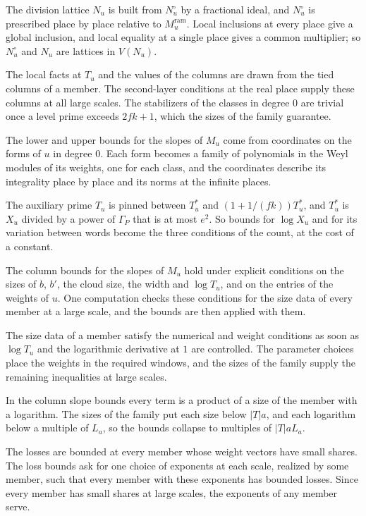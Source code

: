 The division lattice $N_u$ is built from $N^\circ_u$ by a fractional ideal,
and $N^\circ_u$ is prescribed place by place relative to $M^{\mathrm{ram}}_u$.
Local inclusions at every place give a global inclusion, and local equality at
a single place gives a common multiplier; so $N^\circ_u$ and $N_u$ are lattices
in $V(N_u)$.

The local facts at $T_u$ and the values of the columns are drawn from the tied
columns of a member. The second-layer conditions at the real place supply these
columns at all large scales. The stabilizers of the classes in degree $0$ are
trivial once a level prime exceeds $2fk+1$, which the sizes of the family
guarantee.

The lower and upper bounds for the slopes of $M_u$ come from coordinates on the
forms of $u$ in degree $0$. Each form becomes a family of polynomials in the
Weyl modules of its weights, one for each class, and the coordinates describe
its integrality place by place and its norms at the infinite places.

The auxiliary prime $T_u$ is pinned between $T^*_u$ and $(1+1/(fk))T^*_u$, and
$T^*_u$ is $X_u$ divided by a power of $\Gamma_P$ that is at most $e^2$. So
bounds for $\log X_u$ and for its variation between words become the three
conditions of the count, at the cost of a constant.

The column bounds for the slopes of $M_u$ hold under explicit conditions on the
sizes of $b$, $b'$, the cloud size, the width and $\log T_u$, and on the
entries of the weights of $u$. One computation checks these conditions for the
size data of every member at a large scale, and the bounds are then applied
with them.

The size data of a member satisfy the numerical and weight conditions as soon
as $\log T_u$ and the logarithmic derivative at $1$ are controlled. The
parameter choices place the weights in the required windows, and the sizes of
the family supply the remaining inequalities at large scales.

In the column slope bounds every term is a product of a size of the member
with a logarithm. The sizes of the family put each size below $|T|a$, and each
logarithm below a multiple of $L_a$, so the bounds collapse to multiples of
$|T|aL_a$.

The losses are bounded at every member whose weight vectors have small shares.
The loss bounds ask for one choice of exponents at each scale, realized by some
member, such that every member with these exponents has bounded losses. Since
every member has small shares at large scales, the exponents of any member
serve.

